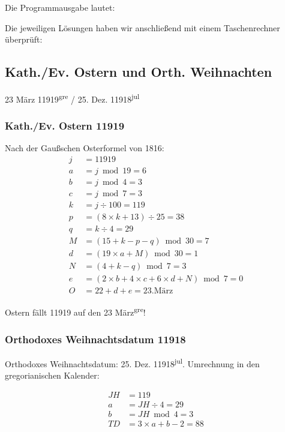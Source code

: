 Die Programmausgabe lautet:


Die jeweiligen Lösungen haben wir anschließend mit einem Taschenrechner überprüft:

	\twocolumn
	\subsection{Kath./Ev. Ostern und Orth. Weihnachten}
		23 März 11919\textsuperscript{gre} / 25. Dez. 11918\textsuperscript{jul}
		\subsubsection{Kath./Ev. Ostern 11919}
			Nach der Gaußschen Osterformel von 1816:
			\begin{align*}
			j &= 11919													\\
			a &= j \bmod 19 = 6											\\
			b &= j \bmod 4 = 3											\\
			c &= j \bmod 7 = 3											\\
			k &= j \div 100 = 119										\\
			p &= (8 \times k + 13) \div 25 = 38							\\
			q &= k \div 4 = 29											\\
			M &= (15 + k - p -q) \bmod 30 = 7							\\
			d &= (19 \times a + M) \bmod 30 = 1							\\
			N &= (4 + k - q) \bmod 7 = 3									\\
			e &= (2 \times b + 4 \times c + 6 \times d + N) \bmod 7 = 0	\\
			O &= 22 + d + e = 23 \text{.März}						
			\end{align*}

			Ostern fällt 11919 auf den 23 März\textsuperscript{gre}!
		\subsubsection{Orthodoxes Weihnachtsdatum 11918}
			Orthodoxes Weihnachtsdatum: 25. Dez. 11918\textsuperscript{jul}. Umrechnung in den gregorianischen Kalender:

			\begin{align*}
			JH &= 119						\\
			a &= JH \div 4 = 29				\\
			b &= JH \bmod 4 = 3				\\
			TD &= 3 \times a + b - 2 = 88 	\\
			\end{align*}

